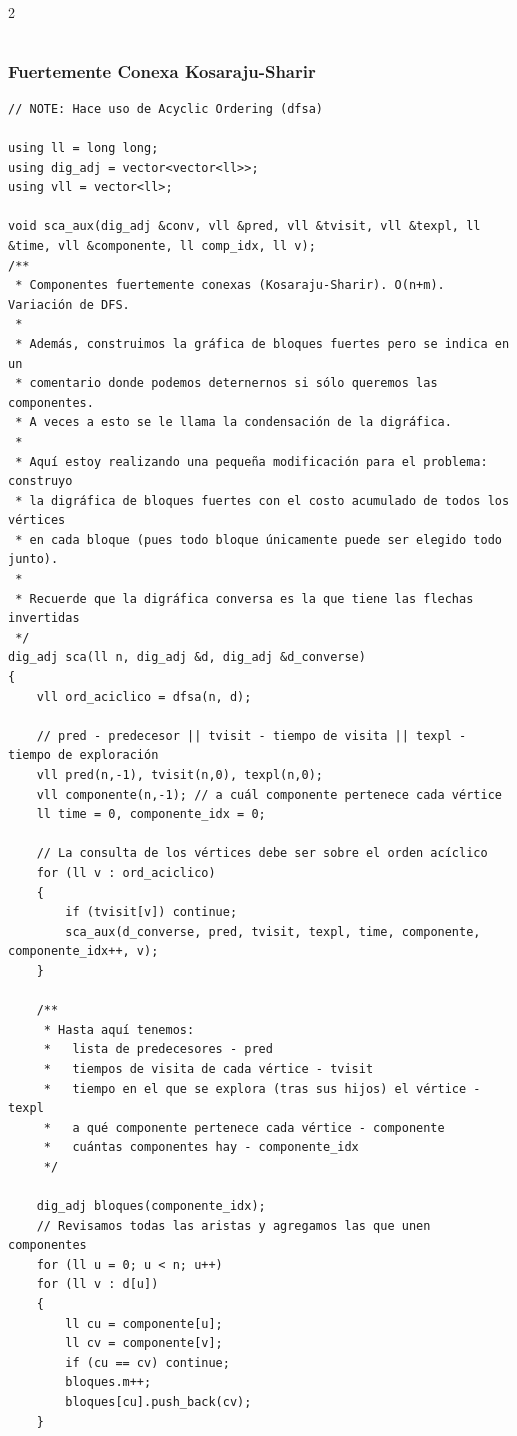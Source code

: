 \documentclass[twoside]{article}
\begin{document}
\begin{multicols*}{2}
\begin{verbatim}
\end{verbatim}

	{
		\subsubsection*{Fuertemente Conexa Kosaraju-Sharir}
	}
	\begin{verbatim}
// NOTE: Hace uso de Acyclic Ordering (dfsa)

using ll = long long;
using dig_adj = vector<vector<ll>>;
using vll = vector<ll>;

void sca_aux(dig_adj &conv, vll &pred, vll &tvisit, vll &texpl, ll &time, vll &componente, ll comp_idx, ll v);
/**
 * Componentes fuertemente conexas (Kosaraju-Sharir). O(n+m). Variación de DFS.
 *
 * Además, construimos la gráfica de bloques fuertes pero se indica en un
 * comentario donde podemos deternernos si sólo queremos las componentes.
 * A veces a esto se le llama la condensación de la digráfica.
 *
 * Aquí estoy realizando una pequeña modificación para el problema: construyo
 * la digráfica de bloques fuertes con el costo acumulado de todos los vértices
 * en cada bloque (pues todo bloque únicamente puede ser elegido todo junto).
 *
 * Recuerde que la digráfica conversa es la que tiene las flechas invertidas
 */
dig_adj sca(ll n, dig_adj &d, dig_adj &d_converse)
{
    vll ord_aciclico = dfsa(n, d);

    // pred - predecesor || tvisit - tiempo de visita || texpl - tiempo de exploración
    vll pred(n,-1), tvisit(n,0), texpl(n,0);
    vll componente(n,-1); // a cuál componente pertenece cada vértice
    ll time = 0, componente_idx = 0;

    // La consulta de los vértices debe ser sobre el orden acíclico
    for (ll v : ord_aciclico)
    {
        if (tvisit[v]) continue;
        sca_aux(d_converse, pred, tvisit, texpl, time, componente, componente_idx++, v);
    }

    /**
     * Hasta aquí tenemos:
     *   lista de predecesores - pred
     *   tiempos de visita de cada vértice - tvisit
     *   tiempo en el que se explora (tras sus hijos) el vértice - texpl
     *   a qué componente pertenece cada vértice - componente
     *   cuántas componentes hay - componente_idx
     */

    dig_adj bloques(componente_idx);
    // Revisamos todas las aristas y agregamos las que unen componentes
    for (ll u = 0; u < n; u++)
    for (ll v : d[u])
    {
        ll cu = componente[u];
        ll cv = componente[v];
        if (cu == cv) continue;
        bloques.m++;
        bloques[cu].push_back(cv);
    }


\end{verbatim}
\end{multicols*}
\end{document}
